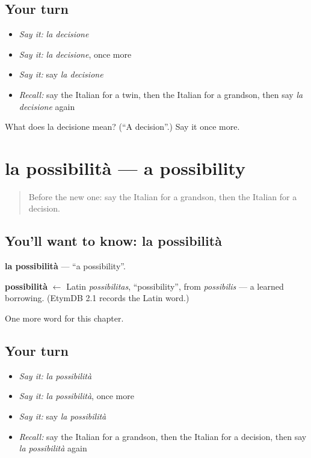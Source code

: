 \subsection*{Your turn}
\begin{itemize}
\raggedright
  \item \emph{Say it:} \emph{la decisione}
  \item \emph{Say it:} \emph{la decisione}, once more
  \item \emph{Say it:} say \emph{la decisione}
  \item \emph{Recall:} say the Italian for a twin, then the Italian for a grandson, then say \emph{la decisione} again
\end{itemize}

\begin{tcolorbox}[breakable,colback=teal!4,colframe=teal!35!black,title={Before you move on}]
What does la decisione mean? (\textquotedblleft{}A decision\textquotedblright{}.) Say it once more.
\end{tcolorbox}
\section[la possibilità]{la possibilità — a possibility}

\label{lesson:IT-C225-possibilita}



\begin{quote}
Before the new one: say the Italian for a grandson, then the Italian for a decision.
\end{quote}

\subsection*{You'll want to know: la possibilità}
\textbf{la possibilità} — \textquotedblleft{}a possibility\textquotedblright{}.

\begin{cousinweb}
\textbf{possibilità} $\leftarrow$ Latin \emph{possibilitas}, \textquotedblleft{}possibility\textquotedblright{}, from \emph{possibilis} — a learned borrowing. (EtymDB 2.1 records the Latin word.)
\end{cousinweb}

\begin{grammarlens}[title={What you've built}]
One more word for this chapter.
\end{grammarlens}

\subsection*{Your turn}
\begin{itemize}
\raggedright
  \item \emph{Say it:} \emph{la possibilità}
  \item \emph{Say it:} \emph{la possibilità}, once more
  \item \emph{Say it:} say \emph{la possibilità}
  \item \emph{Recall:} say the Italian for a grandson, then the Italian for a decision, then say \emph{la possibilità} again
\end{itemize}

